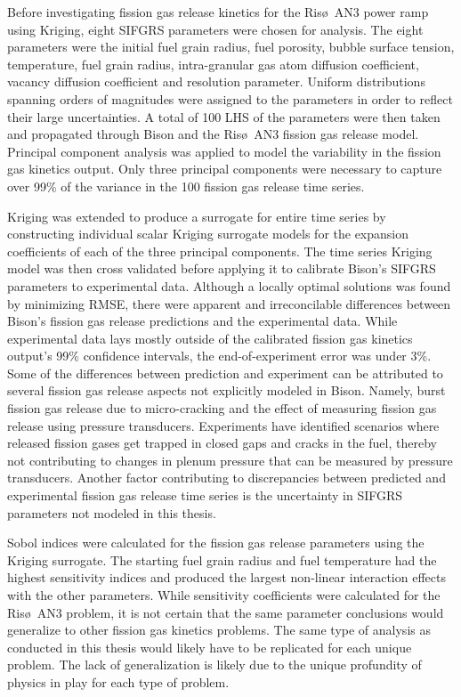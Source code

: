 Before investigating fission gas release kinetics for the Ris\o~AN3 power ramp using Kriging, eight \ac{SIFGRS} parameters were chosen for analysis. The eight parameters were the initial fuel grain radius, fuel porosity, bubble surface tension, temperature, fuel grain radius, intra-granular gas atom diffusion coefficient, vacancy diffusion coefficient and resolution parameter. Uniform distributions spanning orders of magnitudes were assigned to the parameters in order to reflect their large uncertainties. A total of 100 \ac{LHS} of the parameters were then taken and propagated through Bison and the Ris\o~AN3 fission gas release model. Principal component analysis was applied to model the variability in the fission gas kinetics output. Only three principal components were necessary to capture over 99\% of the variance in the 100 fission gas release time series.    

Kriging was extended to produce a surrogate for entire time series by constructing individual scalar Kriging surrogate models for the expansion coefficients of each of the three principal components. The time series Kriging model was then cross validated before applying it to calibrate Bison's \ac{SIFGRS} parameters to experimental data. Although a locally optimal solutions was found by minimizing \ac{RMSE}, there were apparent and irreconcilable differences between Bison's fission gas release predictions and the experimental data. While experimental data lays mostly outside of the calibrated fission gas kinetics output's 99\% confidence intervals, the end-of-experiment error was under 3\%. Some of the differences between prediction and experiment can be attributed to several fission gas release aspects not explicitly modeled in Bison. Namely, burst fission gas release due to micro-cracking and the effect of measuring fission gas release using pressure transducers. Experiments have identified scenarios where released fission gases get trapped in closed gaps and cracks in the fuel, thereby not contributing to changes in plenum pressure that can be measured by pressure transducers. Another factor contributing to discrepancies between predicted and experimental fission gas release time series is the uncertainty in \ac{SIFGRS} parameters not modeled in this thesis.    

Sobol indices were calculated for the fission gas release parameters using the Kriging surrogate. The starting fuel grain radius and fuel temperature had the highest sensitivity indices and produced the largest non-linear interaction effects with the other parameters. While sensitivity coefficients were calculated for the Ris\o~AN3 problem, it is not certain that the same parameter conclusions would generalize to other fission gas kinetics problems. The same type of analysis as conducted in this thesis would likely have to be replicated for each unique problem. The lack of generalization is likely due to the unique profundity of physics in play for each type of problem. 

